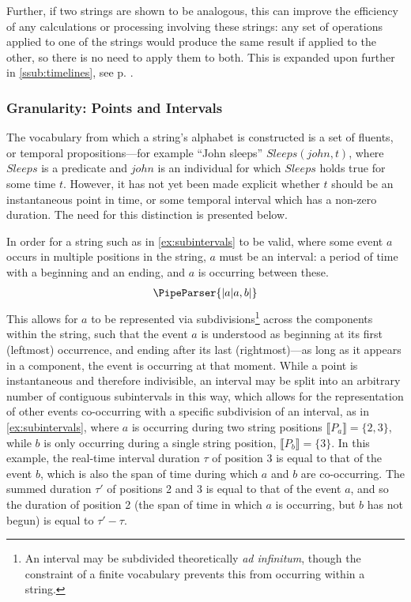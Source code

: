 \documentclass[a4paper,12pt,leqno]{article}
\newcommand{\vph}[1]{\vphantom{#1}}
\newcommand{\ebox}[1]{\fbox{$\vph{'(),}#1$}}
\newcommand{\EventString}[1]{%
	\renewcommand*{\do}[1]{\ebox{##1}}%
	\PipeParser{#1}%
}
\begin{document}
Further, if two strings are shown to be analogous, this can improve the efficiency of any calculations or processing involving these strings: any set of operations applied to one of the strings would produce the same result if applied to the other, so there is no need to apply them to both. This is expanded upon further in \cref{ssub:timelines}, see p. \pageref{ex:sp-analogy}.

\subsubsection{Granularity: Points and Intervals}\label{ssub:granularity}
The vocabulary from which a string's alphabet is constructed is a set of fluents, or temporal propositions---for example ``John sleeps'' $Sleeps(john, t)$, where $Sleeps$ is a predicate and $john$ is an individual for which $Sleeps$ holds true for some time $t$. However, it has not yet been made explicit whether $t$ should be an instantaneous point in time, or some temporal interval which has a non-zero duration. The need for this distinction is presented below.

In order for a string such as in \cref{ex:subintervals} to be valid, where some event $a$ occurs in multiple positions in the string, $a$ must be an interval: a period of time with a beginning and an ending, and $a$ is occurring between these.
\begin{align}\label{ex:subintervals}
	\EventString{{}|a|a,b|{}}
\end{align}
This allows for $a$ to be represented via subdivisions\footnote{An interval may be subdivided theoretically \textit{ad infinitum}, though the constraint of a finite vocabulary prevents this from occurring within a string.} across the components within the string, such that the event $a$ is understood as beginning at its first (leftmost) occurrence, and ending after its last (rightmost)---as long as it appears in a component, the event is occurring at that moment. While a point is instantaneous and therefore indivisible, an interval may be split into an arbitrary number of contiguous subintervals in this way, which allows for the representation of other events co-occurring with a specific subdivision of an interval, as in \cref{ex:subintervals}, where $a$ is occurring during two string positions $\llbracket P_a \rrbracket = \{2, 3\}$, while $b$ is only occurring during a single string position, $\llbracket P_b \rrbracket = \{3\}$. In this example, the real-time interval duration $\tau$ of position 3 is equal to that of the event $b$, which is also the span of time during which $a$ and $b$ are co-occurring. The summed duration $\tau'$ of positions 2 and 3 is equal to that of the event $a$, and so the duration of position 2 (the span of time in which $a$ is occurring, but $b$ has not begun) is equal to $\tau' - \tau$.
\end{document}
